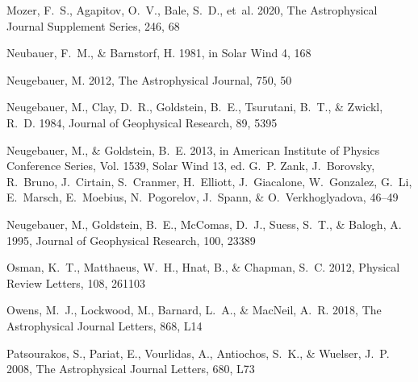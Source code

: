 \documentclass[]{aastex62}
\begin{document}
\begin{thebibliography}{}
{Mozer}, F.~S., {Agapitov}, O.~V., {Bale}, S.~D., {et~al.} 2020, The
  Astrophysical Journal Supplement Series, 246, 68

{Neubauer}, F.~M., \& {Barnstorf}, H. 1981, in Solar Wind 4, 168

{Neugebauer}, M. 2012, The Astrophysical Journal, 750, 50

{Neugebauer}, M., {Clay}, D.~R., {Goldstein}, B.~E., {Tsurutani}, B.~T., \&
  {Zwickl}, R.~D. 1984, Journal of Geophysical Research, 89, 5395

{Neugebauer}, M., \& {Goldstein}, B.~E. 2013, in American Institute of Physics
  Conference Series, Vol. 1539, Solar Wind 13, ed. G.~P. {Zank}, J.~{Borovsky},
  R.~{Bruno}, J.~{Cirtain}, S.~{Cranmer}, H.~{Elliott}, J.~{Giacalone},
  W.~{Gonzalez}, G.~{Li}, E.~{Marsch}, E.~{Moebius}, N.~{Pogorelov},
  J.~{Spann}, \& O.~{Verkhoglyadova}, 46--49

{Neugebauer}, M., {Goldstein}, B.~E., {McComas}, D.~J., {Suess}, S.~T., \&
  {Balogh}, A. 1995, Journal of Geophysical Research, 100, 23389

{Osman}, K.~T., {Matthaeus}, W.~H., {Hnat}, B., \& {Chapman}, S.~C. 2012,
  Physical Review Letters, 108, 261103

{Owens}, M.~J., {Lockwood}, M., {Barnard}, L.~A., \& {MacNeil}, A.~R. 2018, The
  Astrophysical Journal Letters, 868, L14

{Patsourakos}, S., {Pariat}, E., {Vourlidas}, A., {Antiochos}, S.~K., \&
  {Wuelser}, J.~P. 2008, The Astrophysical Journal Letters, 680, L73


\end{thebibliography}
\end{document}
